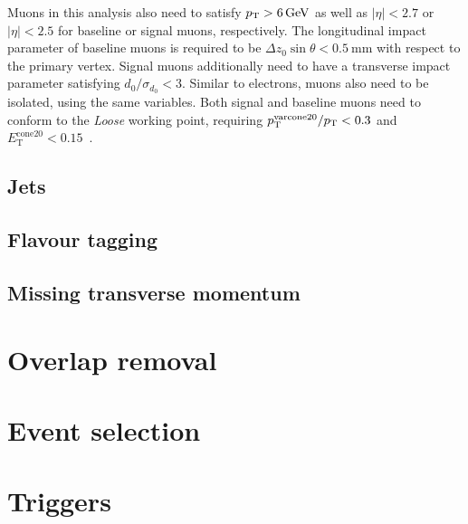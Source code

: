 Muons in this analysis also need to satisfy $\pt > \SI{6}{\GeV}$ as well as $\vert\eta\vert < 2.7$ or $\vert\eta\vert < 2.5$ for baseline or signal muons, respectively. The longitudinal impact parameter of baseline muons is required to be $\Delta z_0\sin\theta < \SI{0.5}{\milli\meter}$ with respect to the primary vertex. Signal muons additionally need to have a transverse impact parameter satisfying $d_0/\sigma_{d_0} < 3$. Similar to electrons, muons also need to be isolated, using the same variables. Both signal and baseline muons need to conform to the \textit{Loose} working point, requiring $p_{\mathrm{T}}^{\mathrm{varcone20}}/p_{\textrm{T}} < 0.3$ and $E_{\mathrm{T}}^{\mathrm{cone20}} < 0.15$~\cite{Aad:2020gmm}.


\subsection{Jets}

\subsection{Flavour tagging}

\subsection{Missing transverse momentum}

\section{Overlap removal}

\section{Event selection}

\section{Triggers}